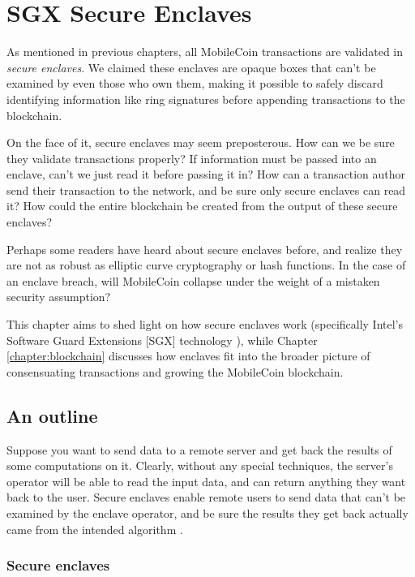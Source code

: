 \chapter{SGX Secure Enclaves}
\label{chapter:enclaves}

As mentioned in previous chapters, all MobileCoin transactions are validated in {\em secure enclaves}. We claimed these enclaves are opaque boxes that can't be examined by even those who own them, making it possible to safely discard identifying information like ring signatures before appending transactions to the blockchain.

On the face of it, secure enclaves may seem preposterous. How can we be sure they validate transactions properly? If information must be passed into an enclave, can't we just read it before passing it in? How can a transaction author send their transaction to the network, and be sure only secure enclaves can read it? How could the entire blockchain be created from the output of these secure enclaves?

Perhaps some readers have heard about secure enclaves before, and realize they are not as robust as elliptic curve cryptography or hash functions. In the case of an enclave breach, will MobileCoin collapse under the weight of a mistaken security assumption?

This chapter aims to shed light on how secure enclaves work (specifically Intel's Software Guard Extensions [SGX] technology \cite{kudelski-sgx-secure-enclaves-review, intel-sgx-explained-advanced}), while Chapter \ref{chapter:blockchain} discusses how enclaves fit into the broader picture of consensuating transactions and growing the MobileCoin blockchain.



\section{An outline}
\label{sec:secure-enclave-outline}

Suppose you want to send data to a remote server and get back the results of some computations on it. Clearly, without any special techniques, the server's operator will be able to read the input data, and can return anything they want back to the user. Secure enclaves enable remote users to send data that can't be examined by the enclave operator, and be sure the results they get back actually came from the intended algorithm \cite{intel-sgx-explained-advanced}.


\subsection{Secure enclaves}
\label{subsec:simple-enclave-secure-enclave}


